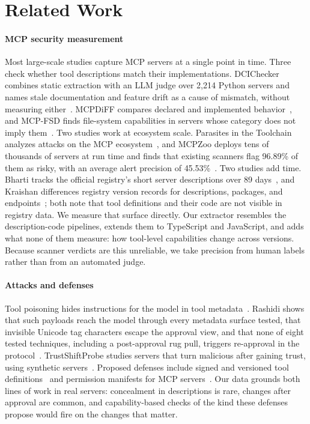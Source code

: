 \section{Related Work}\label{sec:related}

\paragraph{MCP security measurement}
Most large-scale studies capture MCP servers at a single point in time. Three check whether tool descriptions match their implementations. DCIChecker combines static extraction with an LLM judge over 2,214 Python servers and names stale documentation and feature drift as a cause of mismatch, without measuring either~\cite{dcichecker2026}. MCPDiFF compares declared and implemented behavior~\cite{mcpdiff2026}, and MCP-FSD finds file-system capabilities in servers whose category does not imply them~\cite{mcpfsd2026}. Two studies work at ecosystem scale. Parasites in the Toolchain analyzes attacks on the MCP ecosystem~\cite{parasites2026}, and MCPZoo deploys tens of thousands of servers at run time and finds that existing scanners flag 96.89\% of them as risky, with an average alert precision of 45.53\%~\cite{mcpzoo2026}. Two studies add time. Bharti tracks the official registry's short server descriptions over 89 days~\cite{bharti2026registry}, and Kraishan differences registry version records for descriptions, packages, and endpoints~\cite{kraishan2026samename}; both note that tool definitions and their code are not visible in registry data. We measure that surface directly. Our extractor resembles the description-code pipelines, extends them to TypeScript and JavaScript, and adds what none of them measure: how tool-level capabilities change across versions. Because scanner verdicts are this unreliable, we take precision from human labels rather than from an automated judge.

\paragraph{Attacks and defenses}
Tool poisoning hides instructions for the model in tool metadata~\cite{invariant2025poisoning}. Rashidi shows that such payloads reach the model through every metadata surface tested, that invisible Unicode tag characters escape the approval view, and that none of eight tested techniques, including a post-approval rug pull, triggers re-approval in the protocol~\cite{unicodetag2026}. TrustShiftProbe studies servers that turn malicious after gaining trust, using synthetic servers~\cite{trustshiftprobe2026}. Proposed defenses include signed and versioned tool definitions~\cite{etdi2025} and permission manifests for MCP servers~\cite{agentbound2025}. Our data grounds both lines of work in real servers: concealment in descriptions is rare, changes after approval are common, and capability-based checks of the kind these defenses propose would fire on the changes that matter.

